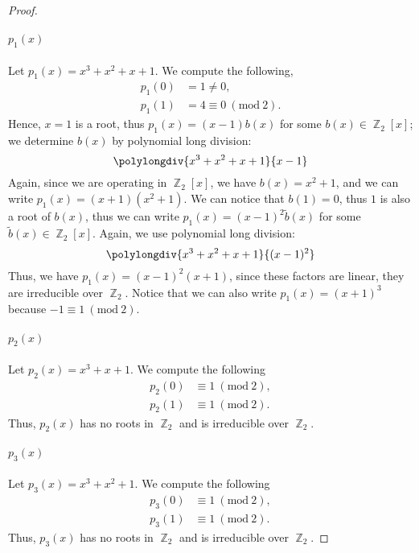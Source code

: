 \documentclass[letterpaper, 12pt]{amsart}
\DeclareMathOperator{\Z}{\mathbb{Z}}
\renewcommand{\mod}[1]{\ (\mathrm{mod}\ #1)}
\begin{document}
\begin{proof}
	\paragraph{$p_{1}(x)$}
	Let $p_{1}(x) = x^{3} + x^{2} + x + 1$.
	We compute the following,
		\begin{align*}
		p_{1}(0) &= 1 \neq 0, \\
		p_{1}(1) &= 4 \equiv 0 \mod{2}.
		\end{align*}
	Hence, $x = 1$ is a root, thus $p_{1}(x) = (x-1)b(x)$ for some $b(x) \in \Z_{2}[x]$; we determine $b(x)$ by polynomial long division: $$\polylongdiv{x^{3} + x^{2} + x + 1}{x - 1}$$
	Again, since we are operating in $\Z_{2}[x]$, we have $b(x) = x^{2} + 1$, and we can write $p_{1}(x) = (x + 1)(x^{2} + 1)$.
	We can notice that $b(1) = 0$, thus $1$ is also a root of $b(x)$, thus we can write $p_{1}(x) = (x-1)^{2}\tilde{b}(x)$ for some $\tilde{b}(x) \in \Z_{2}[x]$.
	Again, we use polynomial long division: $$\polylongdiv{x^{3} + x^{2} + x + 1}{(x - 1)^{2}}$$
	Thus, we have $p_{1}(x) = (x-1)^{2}(x+1)$, since these factors are linear, they are irreducible over $\Z_{2}$.
	Notice that we can also write $p_{1}(x) = (x+1)^{3}$ because $-1 \equiv 1 \mod{2}$.
	\vspace{5mm}
	
	\paragraph{$p_{2}(x)$}
	Let $p_{2}(x) = x^{3} + x + 1$.
	We compute the following
		\begin{align*}
		p_{2}(0) &\equiv 1 \mod{2}, \\
		p_{2}(1) &\equiv 1 \mod{2}.
		\end{align*}
	Thus, $p_{2}(x)$ has no roots in $\Z_{2}$ and is irreducible over $\Z_{2}$.
	\vspace{5mm}

	\paragraph{$p_{3}(x)$}
	Let $p_{3}(x) = x^{3} + x^{2} + 1$.
	We compute the following
		\begin{align*}
		p_{3}(0) &\equiv 1 \mod{2}, \\
		p_{3}(1) &\equiv 1 \mod{2}.
		\end{align*}
	Thus, $p_{3}(x)$ has no roots in $\Z_{2}$ and is irreducible over $\Z_{2}$.
	\vspace{5mm}


\end{proof}
\end{document}
